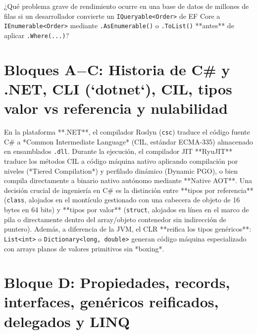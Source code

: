 \documentclass{book}
\begin{document}
\begin{tcolorbox}[title={Autoficha}, studiumcheck, breakable]

¿Qué problema grave de rendimiento ocurre en una base de datos de millones de filas si un desarrollador convierte un \texttt{IQueryable<Order>} de EF Core a \texttt{IEnumerable<Order>} mediante \texttt{.AsEnumerable()} o \texttt{.ToList()} **antes** de aplicar \texttt{.Where(...)}?
\end{tcolorbox}

\section{Bloques A\(-\)C: Historia de C\# y .NET, CLI (`dotnet`), CIL, tipos valor vs referencia y nulabilidad}

En la plataforma **.NET**, el compilador Roslyn (\texttt{csc}) traduce el código fuente C\# a *Common Intermediate Language* (CIL, estándar ECMA-335) almacenado en ensamblados \texttt{.dll}. Durante la ejecución, el compilador JIT **RyuJIT** traduce los métodos CIL a código máquina nativo aplicando compilación por niveles (*Tiered Compilation*) y perfilado dinámico (Dynamic PGO), o bien compila directamente a binario nativo autónomo mediante **Native AOT**. Una decisión crucial de ingeniería en C\# es la distinción entre **tipos por referencia** (\texttt{class}, alojados en el montículo gestionado con una cabecera de objeto de 16 bytes en 64 bits) y **tipos por valor** (\texttt{struct}, alojados en línea en el marco de pila o directamente dentro del array/objeto contenedor sin indirección de puntero). Además, a diferencia de la JVM, el CLR **reifica los tipos genéricos**: \texttt{List<int>} o \texttt{Dictionary<long, double>} generan código máquina especializado con arrays planos de valores primitivos sin *boxing*.

\section{Bloque D: Propiedades, records, interfaces, genéricos reificados, delegados y LINQ}
\end{document}
